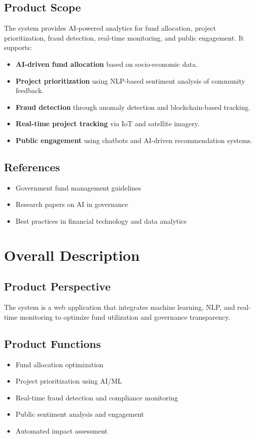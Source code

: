 \documentclass{article}
\begin{document}
\subsection{Product Scope}
The system provides AI-powered analytics for fund allocation, project prioritization, fraud detection, real-time monitoring, and public engagement. It supports:
\begin{itemize}
    \item \textbf{AI-driven fund allocation} based on socio-economic data.
    \item \textbf{Project prioritization} using NLP-based sentiment analysis of community feedback.
    \item \textbf{Fraud detection} through anomaly detection and blockchain-based tracking.
    \item \textbf{Real-time project tracking} via IoT and satellite imagery.
    \item \textbf{Public engagement} using chatbots and AI-driven recommendation systems.
\end{itemize}

\subsection{References}
\begin{itemize}
    \item Government fund management guidelines
    \item Research papers on AI in governance
    \item Best practices in financial technology and data analytics
\end{itemize}

\newpage
\section{Overall Description}
\subsection{Product Perspective}
The system is a web application that integrates machine learning, NLP, and real-time monitoring to optimize fund utilization and governance transparency.

\subsection{Product Functions}
\begin{itemize}
    \item Fund allocation optimization
    \item Project prioritization using AI/ML
    \item Real-time fraud detection and compliance monitoring
    \item Public sentiment analysis and engagement
    \item Automated impact assessment
\end{itemize}
\end{document}

